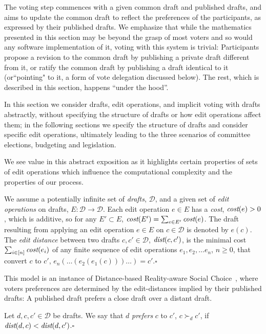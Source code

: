 \documentclass[sigconf]{aamas}  %
\newcommand{\qqed}{\hfill$\square$}
\newcommand{\calD}{\mathcal{D}}
\newcommand{\prefers}[1]{\succ_{#1}}
\newcommand{\dist}{\emph{dist}}
\newcommand{\cost}{\emph{cost}}
\begin{document}
The voting step commences with a given common draft and published drafts, and aims to update the common draft to reflect the preferences of the participants, as expressed by their published drafts. We emphasize that while the mathematics presented in this section may be beyond the grasp of most voters and so would any software implementation of it, voting with this system is trivial:  Participants propose a revision to the common draft by publishing a private draft different from it, or ratify the common draft by publishing a draft identical to it (or``pointing" to it, a form of vote delegation discussed below).  The rest, which is described in this section, happens ``under the hood''.

In this section we consider drafts, edit operations, and implicit voting with drafts abstractly, without specifying the structure of drafts or how edit operations affect them; in the following sections we specify the structure of drafts and consider specific edit operations, ultimately leading to the three scenarios of committee elections, budgeting and legislation.

 We see value in this abstract exposition as it highlights certain properties of sets of edit operations which influence the computational complexity and the properties of our process.

\begin{definition}
%
We assume a potentially infinite set of \emph{drafts}, $\calD$, and a given set of \emph{edit operations} on drafts, $E: \calD \rightarrow \calD$. Each edit operation $e \in E$ has a \emph{cost}, $\cost(e) > 0$,  which is additive, so for any $E' \subset E$, $\cost(E') = \sum_{e \in E'} \cost(e)$. The draft resulting from applying an edit operation $e \in E$ on  $c \in \calD$ is denoted by $e(c)$.  The \emph{edit distance} between two drafts $c, c' \in \calD$, $\dist(c, c')$, is the minimal cost $\sum_{i \in [n]} \cost(e_i)$ of any finite sequence of edit operations $e_1, e_2, \ldots e_n$, $n \ge 0$, that convert $c$  to $c'$, $e_n(\ldots(e_2(e_1(c)))\ldots) = c'$.\qqed  
%
\end{definition}

This model is an instance of Distance-based Reality-aware Social Choice~\cite{realsoc}, where voters preferences are determined by the edit-distances implied by their published drafts:  A published draft prefers a close draft over a distant draft.

\begin{definition}[Prefers]\label{lemma:prefers}
%
Let $d, c, c' \in \calD$ be drafts.  We say that  $d$ \emph{prefers}  $c$ to $c'$, $ c \prefers{d} c'$, if $\dist(d, c) < \dist(d, c')$.\qqed
\end{definition}
\end{document}
